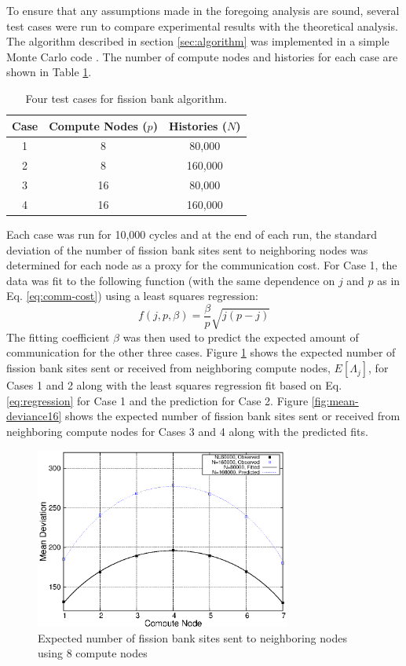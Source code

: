 To ensure that any assumptions made in the foregoing analysis are
sound, several test cases were run to compare experimental results
with the theoretical analysis. The algorithm described in section
\ref{sec:algorithm} was implemented in a simple Monte Carlo code
\cite{romano-LANL}. The number of compute nodes and histories for each
case are shown in Table \ref{tab:cases}.
\begin{table}[h!]
  \centering
  \caption{Four test cases for fission bank algorithm.}
  \label{tab:cases}
  \begin{tabular}{|c|c|c|}
    \hline
    Case & Compute Nodes ($p$) & Histories ($N$) \\
    \hline
    1 & 8 & 80,000 \\
    2 & 8 & 160,000 \\
    3 & 16 & 80,000 \\
    4 & 16 & 160,000 \\
    \hline
  \end{tabular}
\end{table}
Each case was run for 10,000 cycles and at the end of each run, the
standard deviation of the number of fission bank sites sent to
neighboring nodes was determined for each node as a proxy for the
communication cost. For Case 1, the data was fit to the following
function (with the same dependence on $j$ and $p$ as in
Eq. \ref{eq:comm-cost}) using a least squares regression:
\begin{equation}\label{eq:regression}
  f(j,p,\beta) = \frac{\beta}{p} \sqrt{j(p-j)}
\end{equation}
The fitting coefficient $\beta$ was then used to predict the expected
amount of communication for the other three cases. Figure
\ref{fig:mean-deviance8} shows the expected number of fission bank
sites sent or received from neighboring compute nodes, $E \left [
  \Lambda_j \right ]$, for Cases 1 and 2 along with the least squares
regression fit based on Eq. \ref{eq:regression} for Case 1 and the
prediction for Case 2. Figure \ref{fig:mean-deviance16} shows the
expected number of fission bank sites sent or received from
neighboring compute nodes for Cases 3 and 4 along with the predicted
fits.
\begin{figure}[h!]
  \centering
  \includegraphics[width=0.75\textwidth]{figures/mean_deviance/plot8.eps}
  \caption{Expected number of fission bank sites sent to neighboring
    nodes using 8 compute nodes}
  \label{fig:mean-deviance8}
\end{figure}
